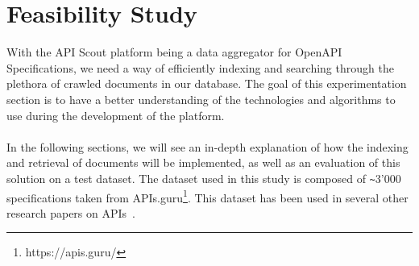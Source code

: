 \chapter{Feasibility Study}\label{ch:experimentation}

With the API Scout platform being a data aggregator for OpenAPI Specifications, we need a way of efficiently indexing and searching through the plethora of crawled documents in our database.
The goal of this experimentation section is to have a better understanding of the technologies and algorithms to use during the development of the platform. \\ \\
In the following sections, we will see an in-depth explanation of how the indexing and retrieval of documents will be implemented, as well as an evaluation of this solution on a test dataset.
The dataset used in this study is composed of \verb|~|3'000 specifications taken from APIs.guru\footnote{https://apis.guru/}.
This dataset has been used in several other research papers on APIs~\cite{ma_restful_2023, kim_empirical_2019, tsai_rest_2021, yasmin_first_2020, moon_api-miner_2022, yang_towards_2018, ma_api_2020}.






